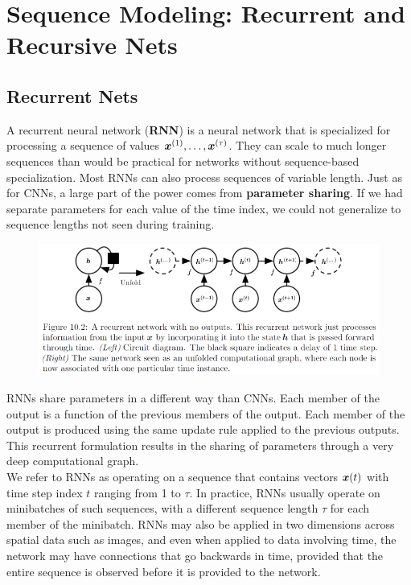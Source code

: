 \section{Sequence Modeling: Recurrent and Recursive Nets}
\begin{multicols}{2}
	\subsection{Recurrent Nets}
	A recurrent neural network (\textbf{RNN}) is a neural network that is specialized for processing a sequence of values ${\bm{x}}^{(1)},\dots,{\bm{x}}^{(\tau)}$.
	They can scale to much longer sequences than would be practical for networks without sequence-based specialization.
	Most RNNs can also process sequences of variable length.
	Just as for CNNs, a large part of the power comes from \textbf{parameter sharing}.
	If we had separate parameters for each value of the time index, we could not generalize to sequence lengths not seen during training.
	\begin{figure}[H]
		\centering
		\includegraphics[width=\linewidth]{images/recurr1.png}
	\end{figure}

	RNNs share parameters in a different way than CNNs.
	Each member of the output is a function of the previous members of the output.
	Each member of the output is produced using the same update rule applied to the previous outputs.
	This recurrent formulation results in the sharing of parameters through a very deep computational graph.\\

	We refer to RNNs as operating on a sequence that contains vectors ${\bm{x}}(t)$ with time step index $t$ ranging from 1 to $\tau$.
	In practice, RNNs usually operate on minibatches of such sequences, with a different sequence length $\tau$ for each member of the minibatch.
	RNNs may also be applied in two dimensions across spatial data such as images, and even when applied to data involving time, the network may have connections that go backwards in time, provided that the entire sequence is observed before it is provided to the network.


\end{multicols}

